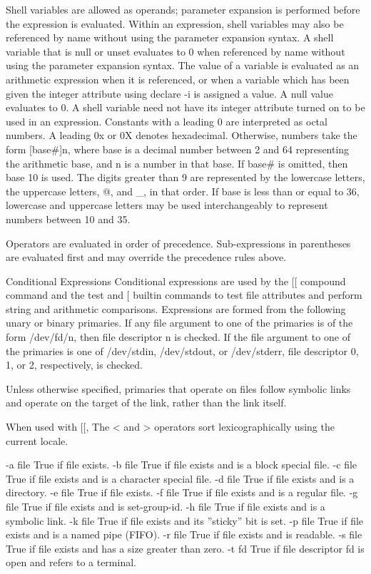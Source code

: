 Shell variables are allowed as operands; parameter expansion is performed before the expression is evaluated. Within an expression, shell variables may also be referenced by name without using the parameter expansion syntax. A shell variable that is null or unset evaluates to 0 when referenced by name without using the parameter expansion syntax. The value of a variable is evaluated as an arithmetic expression when it is referenced, or when a variable which has been given the integer attribute using declare -i is assigned a value. A null value evaluates to 0. A shell variable need not have its integer attribute turned on to be used in an expression.
Constants with a leading 0 are interpreted as octal numbers. A leading 0x or 0X denotes hexadecimal. Otherwise, numbers take the form [base\#]n, where base is a decimal number between 2 and 64 representing the arithmetic base, and n is a number in that base. If base\# is omitted, then base 10 is used. The digits greater than 9 are represented by the lowercase letters, the uppercase letters, @, and \_, in that order. If base is less than or equal to 36, lowercase and uppercase letters may be used interchangeably to represent numbers between 10 and 35.

Operators are evaluated in order of precedence. Sub-expressions in parentheses are evaluated first and may override the precedence rules above.

Conditional Expressions
Conditional expressions are used by the [[ compound command and the test and [ builtin commands to test file attributes and perform string and arithmetic comparisons. Expressions are formed from the following unary or binary primaries. If any file argument to one of the primaries is of the form /dev/fd/n, then file descriptor n is checked. If the file argument to one of the primaries is one of /dev/stdin, /dev/stdout, or /dev/stderr, file descriptor 0, 1, or 2, respectively, is checked.

Unless otherwise specified, primaries that operate on files follow symbolic links and operate on the target of the link, rather than the link itself.

When used with [[, The < and > operators sort lexicographically using the current locale.

-a file
True if file exists.
-b file
True if file exists and is a block special file.
-c file
True if file exists and is a character special file.
-d file
True if file exists and is a directory.
-e file
True if file exists.
-f file
True if file exists and is a regular file.
-g file
True if file exists and is set-group-id.
-h file
True if file exists and is a symbolic link.
-k file
True if file exists and its ''sticky'' bit is set.
-p file
True if file exists and is a named pipe (FIFO).
-r file
True if file exists and is readable.
-s file
True if file exists and has a size greater than zero.
-t fd
True if file descriptor fd is open and refers to a terminal.

